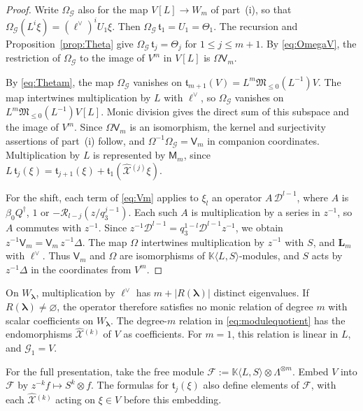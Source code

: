 \documentclass[11pt]{amsart}
\theoremstyle{definition}
\theoremstyle{remark}
\newcommand{\K}{\mathbb K}                       %
\newcommand{\betaz}{\beta_0}                     %
\newcommand{\La}{\Lambda}                        %
\newcommand{\bl}{{\boldsymbol{\lambda}}}         %
\newcommand{\Rem}[1]{R(#1)}                      %
\newcommand{\Wfib}[1]{W_{#1}}                    %
\newcommand{\Wsp}[1]{W_{#1}}                     %
\newcommand{\taut}{\ell}                         %
\newcommand{\dtaut}{\taut^{\vee}}                %
\newcommand{\Shift}{S}                           %
\newcommand{\Omap}{\Omega}                       %
\newcommand{\OmapG}{\Omega_{\mathcal G}}         %
\newcommand{\Llet}{L}                            %
\newcommand{\Gmod}[1]{\mathcal G_{#1}}           %
\newcommand{\Trunc}[1]{\mathfrak t_{#1}}         %
\newcommand{\LL}{\mathbf L}
\newcommand{\Lax}[1]{\LL_{#1}}                   %
\newcommand{\DD}{\mathcal D}
\newcommand{\Xhat}[1]{\widehat{\mathcal X}{}^{(#1)}}   %
\newcommand{\MM}{\mathsf M}
\newcommand{\Miura}[1]{\MM_{#1}}                 %
\newcommand{\VV}{\mathsf V}
\newcommand{\Vconj}[1]{\VV_{#1}}                 %
\newcommand{\Rlast}[1]{\mathcal R_{#1}}          %
\newcommand{\Miuraop}{\mathfrak M}               %
\newcommand{\Miuraproj}{\Miuraop_{\leq0}}         %
\newcommand{\Qan}{Q^\dagger}                     %
\begin{document}
\begin{proof}
Write \(\OmapG\) also for the map \(V[\Llet]\to\Wsp{m}\) of part~(i), so that
\(\OmapG(\Llet^i\xi)=(\dtaut)^iU_1\xi\). Then \(\OmapG\,\Trunc{1}=U_1=\Theta_1\).
The recursion and Proposition~\ref{prop:Theta} give
\(\OmapG\,\Trunc{j}=\Theta_j\) for \(1\leq j\leq m+1\).
By \eqref{eq:OmegaV}, the restriction of \(\OmapG\) to the image of \(V^m\) in
\(V[\Llet]\) is \(\Omap\Vconj{m}\).

By \eqref{eq:Thetam}, the map \(\OmapG\) vanishes on
\(\Trunc{m+1}(V)=\Llet^m\Miuraproj(\Llet^{-1})V\).
The map intertwines multiplication by \(\Llet\) with \(\dtaut\), so
\(\OmapG\) vanishes on \(\Llet^m\Miuraproj(\Llet^{-1})V[\Llet]\).
Monic division gives the direct sum of this subspace and the image of \(V^m\).
Since \(\Omap\Vconj{m}\) is an isomorphism, the kernel and surjectivity assertions
of part~(i) follow, and \(\Omap^{-1}\OmapG=\Vconj{m}\) in companion coordinates.
Multiplication by \(\Llet\) is represented by \(\Miura{m}\), since
\(\Llet\,\Trunc{j}(\xi)=\Trunc{j+1}(\xi)+\Trunc{1}(\Xhat{j}\xi)\).

For the shift, each term of \eqref{eq:Vm} applies to \(\xi_l\) an operator \(A\,\DD^{l-1}\), where \(A\) is
\(\betaz\Qan\), \(1\) or \(-\Rlast{l-j}(z/q_3^{j-1})\). Each such \(A\) is multiplication by a series in
\(z^{-1}\), so \(A\) commutes with \(z^{-1}\). Since
\(z^{-1}\DD^{l-1}=q_3^{1-l}\DD^{l-1}z^{-1}\), we obtain
\(z^{-1}\Vconj{m}=\Vconj{m}\,z^{-1}\Delta\).
The map \(\Omap\) intertwines multiplication by \(z^{-1}\) with \(\Shift\),
and \(\Lax{m}\) with \(\dtaut\).
Thus \(\Vconj{m}\) and \(\Omap\) are isomorphisms of \(\K\langle\Llet,\Shift\rangle\)-modules, and
\(\Shift\) acts by \(z^{-1}\Delta\) in the coordinates from \(V^m\).
\end{proof}

On \(\Wfib{\bl}\), multiplication by \(\dtaut\) has
\(m+|\Rem{\bl}|\) distinct eigenvalues. If \(\Rem{\bl}\neq\varnothing\), the operator
therefore satisfies no monic relation of degree \(m\) with scalar coefficients
on \(\Wfib{\bl}\). The degree-\(m\) relation in \eqref{eq:modulequotient} has the
endomorphisms \(\Xhat{k}\) of \(V\) as coefficients. For \(m=1\), this
relation is linear in \(\Llet\), and \(\Gmod{1}=V\).

For the full presentation, take the free module
\(\mathcal F:=\K\langle\Llet,\Shift\rangle\otimes\La^{\otimes m}\).
Embed \(V\) into \(\mathcal F\) by \(z^{-k}f\mapsto\Shift^k\otimes f\).
The formulas for \(\Trunc{j}(\xi)\) also define elements of \(\mathcal F\), with each
\(\Xhat{k}\) acting on \(\xi\in V\) before this embedding.
\end{document}
